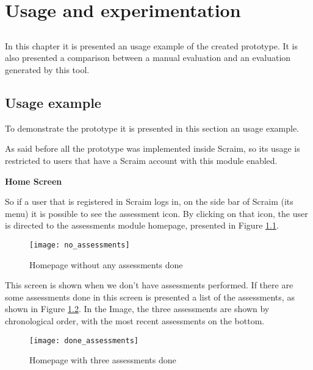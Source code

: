 \chapter{Usage and experimentation} \label{chap:usage}

\section*{}

In this chapter it is presented an usage example of the created prototype. It is also presented a comparison between a manual evaluation and an evaluation generated by this tool.

\section{Usage example} \label{sec:usageexample}

To demonstrate the prototype it is presented in this section an usage example.

As said before all the prototype was implemented inside Scraim, so its usage is restricted to users that have a Scraim account with this module enabled.

\vspace{10 mm}

\textbf{Home Screen}

So if a user that is registered in Scraim logs in, on the side bar of Scraim (its menu) it is possible to see the assessment icon. By clicking on that icon, the user is directed to the assessments module homepage, presented in Figure \ref{fig:no_assessments}.

\begin{figure}[!htb]
	\begin{center}
		\leavevmode
		\texttt{[image: no\_assessments]}
		\caption{Homepage without any assessments done}
		\label{fig:no_assessments}
	\end{center}
\end{figure}

This screen is shown when we don't have assessments performed. If there are some assessments done in this screen is presented a list of the assessments, as shown in Figure \ref{fig:done_assessments}. In the Image, the three assessments are shown by chronological order, with the most recent assessments on the bottom.

\begin{figure}[!htb]
	\begin{center}
		\leavevmode
		\texttt{[image: done\_assessments]}
		\caption{Homepage with three assessments done}
		\label{fig:done_assessments}
	\end{center}
\end{figure}


